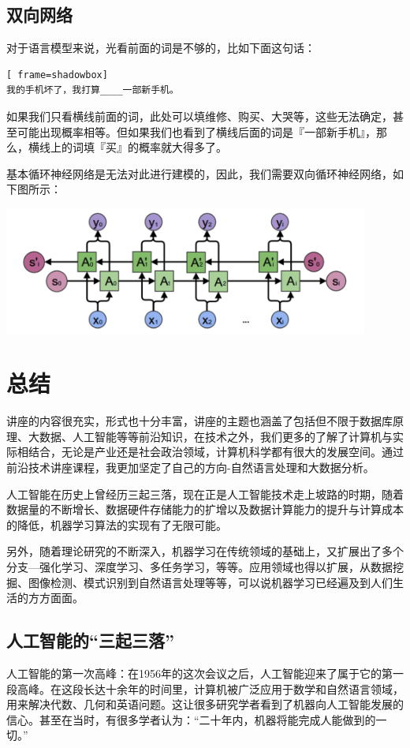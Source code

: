 \documentclass{article}
\begin{document}
\subsection{双向网络}
对于语言模型来说，光看前面的词是不够的，比如下面这句话：
\begin{lstlisting}[ frame=shadowbox]
我的手机坏了，我打算____一部新手机。
\end{lstlisting}
如果我们只看横线前面的词，此处可以填维修、购买、大哭等，这些无法确定，甚至可能出现概率相等。但如果我们也看到了横线后面的词是『一部新手机』，那么，横线上的词填『买』的概率就大得多了。\par 
基本循环神经网络是无法对此进行建模的，因此，我们需要双向循环神经网络，如下图所示： \par 
\centerline{\includegraphics[width=12cm]{shuangxiang}}

\section{总结}
讲座的内容很充实，形式也十分丰富，讲座的主题也涵盖了包括但不限于数据库原理、大数据、人工智能等等前沿知识，在技术之外，我们更多的了解了计算机与实际相结合，无论是产业还是社会政治领域，计算机科学都有很大的发展空间。通过前沿技术讲座课程，我更加坚定了自己的方向-自然语言处理和大数据分析。\par 
人工智能在历史上曾经历三起三落，现在正是人工智能技术走上坡路的时期，随着数据量的不断增长、数据硬件存储能力的扩增以及数据计算能力的提升与计算成本的降低，机器学习算法的实现有了无限可能。\par 
另外，随着理论研究的不断深入，机器学习在传统领域的基础上，又扩展出了多个分支—强化学习、深度学习、多任务学习，等等。应用领域也得以扩展，从数据挖掘、图像检测、模式识别到自然语言处理等等，可以说机器学习已经遍及到人们生活的方方面面。\par
\subsection{人工智能的“三起三落”}
人工智能的第一次高峰：在1956年的这次会议之后，人工智能迎来了属于它的第一段高峰。在这段长达十余年的时间里，计算机被广泛应用于数学和自然语言领域，用来解决代数、几何和英语问题。这让很多研究学者看到了机器向人工智能发展的信心。甚至在当时，有很多学者认为：“二十年内，机器将能完成人能做到的一切。” \par 
\end{document}
